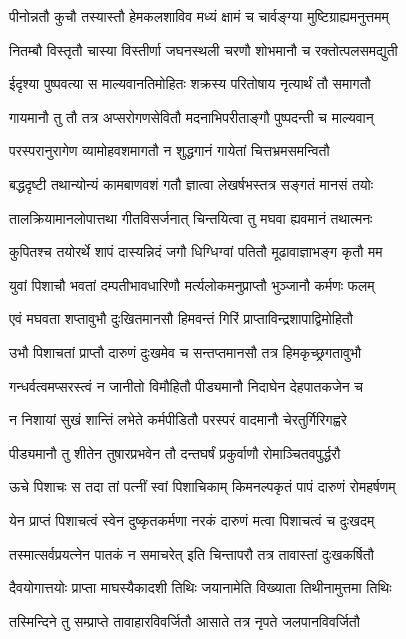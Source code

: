 \twolineshloka
{पीनोन्नतौ कुचौ तस्यास्तौ हेमकलशाविव}
{मध्यं क्षामं च चार्वङ्ग्या मुष्टिग्राह्यमनुत्तमम्}%

\twolineshloka
{नितम्बौ विस्तृतौ चास्या विस्तीर्णा जघनस्थली}
{चरणौ शोभमानौ च रक्तोत्पलसमद्युती}%

\twolineshloka
{ईदृश्या पुष्पवत्या स माल्यवानतिमोहितः}
{शक्रस्य परितोषाय नृत्यार्थं तौ समागतौ}%

\twolineshloka
{गायमानौ तु तौ तत्र अप्सरोगणसेवितौ}
{मदनाभिपरीताङ्गौ पुष्पदन्ती च माल्यवान्}%

\twolineshloka
{परस्परानुरागेण व्यामोहवशमागतौ}
{न शुद्धगानं गायेतां चित्तभ्रमसमन्वितौ}%

\twolineshloka
{बद्धदृष्टी तथान्योन्यं कामबाणवशं गतौ}
{ज्ञात्वा लेखर्षभस्तत्र सङ्गतं मानसं तयोः}%

\twolineshloka
{तालक्रियामानलोपात्तथा गीतविसर्जनात्}
{चिन्तयित्वा तु मघवा ह्यवमानं तथात्मनः}%

\twolineshloka
{कुपितश्च तयोरर्थे शापं दास्यन्निदं जगौ}
{धिग्धिग्वां पतितौ मूढावाज्ञाभङ्ग कृतौ मम}%

\twolineshloka
{युवां पिशाचौ भवतां दम्पतीभावधारिणौ}
{मर्त्यलोकमनुप्राप्तौ भुञ्जानौ कर्मणः फलम्}%

\twolineshloka
{एवं मघवता शप्तावुभौ दुःखितमानसौ}
{हिमवन्तं गिरिं प्राप्ताविन्द्रशापाद्विमोहितौ}%

\twolineshloka
{उभौ पिशाचतां प्राप्तौ दारुणं दुःखमेव च}
{सन्तप्तमानसौ तत्र हिमकृच्छ्रगतावुभौ}%

\twolineshloka
{गन्धर्वत्वमप्सरस्त्वं न जानीतो विमौहितौ}
{पीड्यमानौ निदाघेन देहपातकजेन च}%

\twolineshloka
{न निशायां सुखं शान्तिं लभेते कर्मपीडितौ}
{परस्परं वादमानौ चेरतुर्गिरिगह्वरे}%

\twolineshloka
{पीड्यमानौ तु शीतेन तुषारप्रभवेन तौ}
{दन्तघर्षं प्रकुर्वाणौ रोमाञ्चितवपुर्द्धरौ}%

\twolineshloka
{ऊचे पिशाचः स तदा तां पत्नीं स्वां पिशाचिकाम्}
{किमनल्पकृतं पापं दारुणं रोमहर्षणम्}%

\twolineshloka
{येन प्राप्तं पिशाचत्वं स्वेन दुष्कृतकर्मणा}
{नरकं दारुणं मत्वा पिशाचत्वं च दुःखदम्}%

\twolineshloka
{तस्मात्सर्वप्रयत्नेन पातकं न समाचरेत्}
{इति चिन्तापरौ तत्र तावास्तां दुःखकर्षितौ}%

\twolineshloka
{दैवयोगात्तयोः प्राप्ता माघस्यैकादशी तिथिः}
{जयानामेति विख्याता तिथीनामुत्तमा तिथिः}%

\twolineshloka
{तस्मिन्दिने तु सम्प्राप्ते तावाहारविवर्जितौ}
{आसाते तत्र नृपते जलपानविवर्जितौ}%

